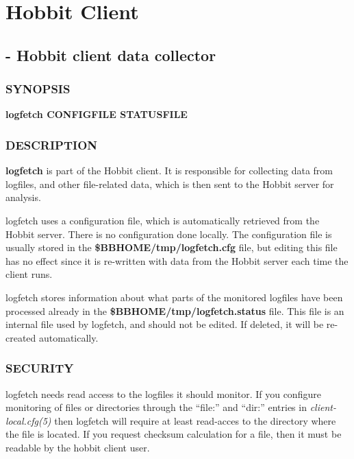 %
\chapter{Hobbit Client}

%
\section{ - Hobbit client data collector }

 
\subsection{SYNOPSIS}
\textbf{logfetch CONFIGFILE STATUSFILE}


 
\subsection{DESCRIPTION}
\textbf{logfetch}
 is part of the Hobbit client. It is responsible for collecting data from logfiles, and other file-related data, which is then sent to the Hobbit server for analysis. 

  logfetch uses a configuration file, which is automatically retrieved from the Hobbit server. There is no configuration done locally. The configuration file is usually stored in the \textbf{\$BBHOME/tmp/logfetch.cfg}
 file, but editing this file has no effect since it is re-written with data from the Hobbit server each time the client runs. 


  logfetch stores information about what parts of the monitored logfiles have been processed already in the \textbf{\$BBHOME/tmp/logfetch.status}
 file. This file is an internal file used by logfetch, and should not be edited. If deleted, it will be re-created automatically. 


 
\subsection{SECURITY}
 logfetch needs read access to the logfiles it should monitor. If you configure monitoring of files or directories through the ``file:'' and ``dir:'' entries in \emph{client-local.cfg(5)}
 then logfetch will require at least read-acces to the directory where the file is located. If you request checksum calculation for a file, then it must be readable by the hobbit client user. 

